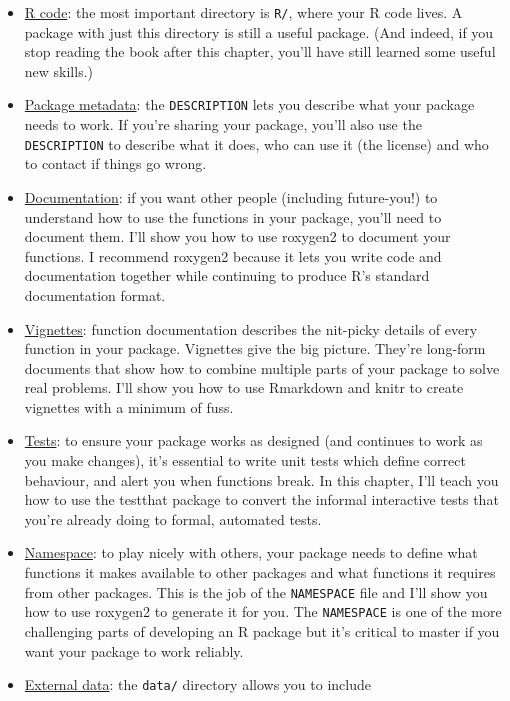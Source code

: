 \documentclass[]{book}
\begin{document}
\begin{itemize}
\item
  \protect\hyperlink{r}{R code}: the most important directory is \texttt{R/}, where your R code lives.
  A package with just this directory is still a useful package. (And indeed,
  if you stop reading the book after this chapter, you'll have still learned
  some useful new skills.)
\item
  \protect\hyperlink{description}{Package metadata}: the \texttt{DESCRIPTION} lets you describe
  what your package needs to work. If you're sharing your package, you'll also
  use the \texttt{DESCRIPTION} to describe what it does, who can use it
  (the license) and who to contact if things go wrong.
\item
  \protect\hyperlink{man}{Documentation}: if you want other people (including future-you!) to
  understand how to use the functions in your package, you'll need to document
  them. I'll show you how to use roxygen2 to document your functions. I
  recommend roxygen2 because it lets you write code and documentation together
  while continuing to produce R's standard documentation format.
\item
  \protect\hyperlink{vignettes}{Vignettes}: function documentation describes the nit-picky
  details of every function in your package. Vignettes give the big picture.
  They're long-form documents that show how to combine multiple parts of your
  package to solve real problems. I'll show you how to use Rmarkdown and knitr
  to create vignettes with a minimum of fuss.
\item
  \protect\hyperlink{tests}{Tests}: to ensure your package works as designed (and continues to
  work as you make changes), it's essential to write unit tests which define
  correct behaviour, and alert you when functions break. In this chapter, I'll
  teach you how to use the testthat package to convert the informal
  interactive tests that you're already doing to formal, automated tests.
\item
  \protect\hyperlink{namespace}{Namespace}: to play nicely with others, your package needs
  to define what functions it makes available to other packages and what
  functions it requires from other packages. This is the job of the \texttt{NAMESPACE}
  file and I'll show you how to use roxygen2 to generate it for you.
  The \texttt{NAMESPACE} is one of the more challenging parts of developing an R
  package but it's critical to master if you want your package to work reliably.
\item
  \protect\hyperlink{data}{External data}: the \texttt{data/} directory allows you to include

\end{itemize}
\end{document}
